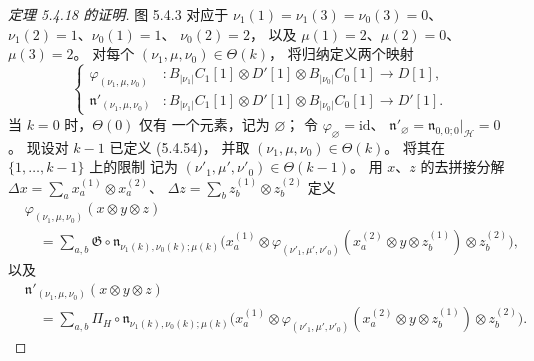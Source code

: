 \begin{proof}[定理 5.4.18 的证明]
图 5.4.3 对应于
$\nu_1(1)=\nu_1(3)=\nu_0(3)=0$、
$\nu_1(2)=1$、$\nu_0(1)=1$、
$\nu_0(2)=2$，
以及 $\mu(1)=2$、$\mu(2)=0$、
$\mu(3)=2$。
对每个
$(\nu_1,\mu,\nu_0)\in\Theta(k)$，
将归纳定义两个映射
\begin{equation}
\left\{\begin{aligned}
\varphi_{(\nu_1,\mu,\nu_0)}&\colon
B_{|\nu_1|}C_1[1]\otimes D'[1]\otimes
B_{|\nu_0|}C_0[1]\longrightarrow D[1],\\
\mathfrak n'_{(\nu_1,\mu,\nu_0)}&\colon
B_{|\nu_1|}C_1[1]\otimes D'[1]\otimes
B_{|\nu_0|}C_0[1]\longrightarrow D'[1].
\end{aligned}\right.
\tag{5.4.54}\label{eq:5-4-54}
\end{equation}
当 $k=0$ 时，$\Theta(0)$ 仅有
一个元素，记为 $\varnothing$；
令 $\varphi_\varnothing=\mathrm{id}$、
$\mathfrak n'_\varnothing
=\mathfrak n_{0,0;0}|_{\mathcal H}=0$。
现设对 $k-1$ 已定义 (5.4.54)，
并取 $(\nu_1,\mu,\nu_0)\in\Theta(k)$。
将其在 $\{1,\ldots,k-1\}$ 上的限制
记为 $(\nu'_1,\mu',\nu'_0)\in\Theta(k-1)$。
用 $x$、$z$ 的去拼接分解
$\Delta x=\sum_a x_a^{(1)}\otimes x_a^{(2)}$、
$\Delta z=\sum_b z_b^{(1)}\otimes z_b^{(2)}$
定义
\begin{equation}
\begin{aligned}
&\varphi_{(\nu_1,\mu,\nu_0)}(x\otimes y\otimes z)\\
&\quad=\sum_{a,b}\mathfrak G\circ
\mathfrak n_{\nu_1(k),\nu_0(k);\mu(k)}
\bigl(x_a^{(1)}\otimes
\varphi_{(\nu'_1,\mu',\nu'_0)}
(x_a^{(2)}\otimes y\otimes z_b^{(1)})
\otimes z_b^{(2)}\bigr),
\end{aligned}
\tag{5.4.55}\label{eq:5-4-55}
\end{equation}
以及
\begin{equation}
\begin{aligned}
&\mathfrak n'_{(\nu_1,\mu,\nu_0)}
(x\otimes y\otimes z)\\
&\quad=\sum_{a,b}\Pi_H\circ
\mathfrak n_{\nu_1(k),\nu_0(k);\mu(k)}
\bigl(x_a^{(1)}\otimes
\varphi_{(\nu'_1,\mu',\nu'_0)}
(x_a^{(2)}\otimes y\otimes z_b^{(1)})
\otimes z_b^{(2)}\bigr).
\end{aligned}
\tag{5.4.56}\label{eq:5-4-56}
\end{equation}

\end{proof}
